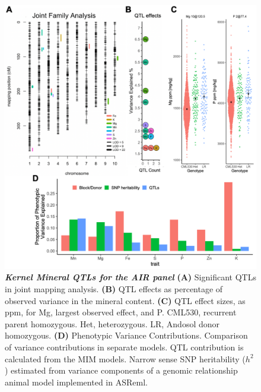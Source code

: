 
\begin{figure}[!ht]
\includegraphics[width=\linewidth]{Chapter-4/figs/mineral_qtls.png}
\caption[Kernel Mineral QTLs for the AIR panel]{\textit{\textbf{Kernel Mineral QTLs for the AIR panel}}
\textbf{(A)} Significant QTLs in joint mapping analysis.
\textbf{(B)} QTL effects as percentage of observed variance in the mineral content. 
\textbf{(C)} QTL effect sizes, as ppm, for Mg, largest observed effect, and P. 
CML530, recurrent parent homozygous.
Het, heterozygous.
LR, Andosol donor homozygous.
\textbf{(D)}  Phenotypic Variance Contributions. 
Comparison of variance contributions in separate models.
QTL contribution is calculated from the MIM models.
Narrow sense SNP heritability ($h^2$) estimated from variance components of a genomic relationship animal model implemented in ASReml.}


\label{fig::mineralQTL}
\end{figure}
\clearpage

